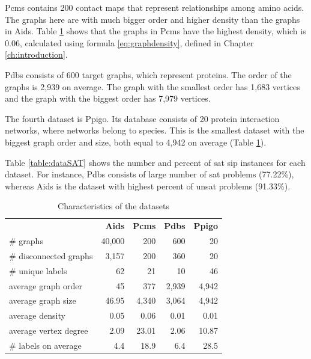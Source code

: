\documentclass{l4proj}
\begin{document}
Pcms contains 200 contact maps that represent relationships among amino acids. The graphs here are with much bigger order and higher density than the graphs in Aids. Table \ref{table:datasets} shows that the graphs in Pcms have the highest density, which is 0.06, calculated using formula \ref{eq:graphdensity}, defined in Chapter \ref{ch:introduction}. 

Pdbs consists of 600 target graphs, which represent proteins. The order of the graphs is 2,939 on average. The graph with the smallest order has 1,683 vertices and the graph with the biggest order has 7,979 vertices.

The fourth dataset is Ppigo. Its database consists of 20 protein interaction networks, where networks belong to species. This is the smallest dataset with the biggest graph order and size, both equal to 4,942 on average (Table \ref{table:datasets}).

Table \ref{table:dataSAT} shows the number and percent of \gls{sat} \gls{sip} instances for each dataset. For instance, Pdbs consists of large number of \gls{sat} problems (77.22\%), whereas Aids is the dataset with highest percent of \gls{unsat} problems (91.33\%).

\begin{table}
\centering
        \renewcommand{\arraystretch}{1.4}%
        \begin{tabular}{l|r|r|r|r|}
\cline{2-5}
& \textbf{Aids} & \textbf{Pcms} & \textbf{Pdbs} & \textbf{Ppigo} \\
\cline{1-5}
\multicolumn{1}{|l|}{\# graphs}  & 40,000 & 200	& 600   & 20 \\
\hline
\multicolumn{1}{|l|}{\# disconnected graphs} & 3,157 & 200 & 360 & 20 \\
\hline
\multicolumn{1}{|l|}{\# unique labels} & 62 & 21 & 10 & 46 \\
\hline
\multicolumn{1}{|l|}{average graph order} & 45 & 377 & 2,939 & 4,942 \\
\hline
\multicolumn{1}{|l|}{average graph size} & 46.95 & 4,340 & 3,064 & 4,942 \\
\hline
\multicolumn{1}{|l|}{average density} & 0.05 & 0.06 & 0.01 & 0.01 \\
\hline
\multicolumn{1}{|l|}{average vertex degree} & 2.09 & 23.01 & 2.06 & 10.87 \\
\hline
\multicolumn{1}{|l|}{\# labels on average} & 4.4 & 18.9 & 6.4 & 28.5 \\
\hline
\end{tabular}
\caption{Characteristics of the datasets}
\label{table:datasets}
\end{table}
\end{document}
